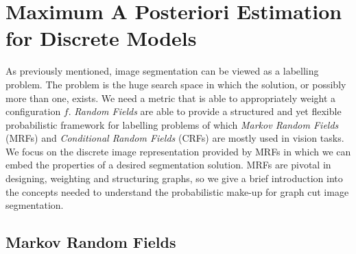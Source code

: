 
\section{Maximum A Posteriori Estimation for Discrete Models}
\label{sec:MAPEstimates}

As previously mentioned, image segmentation can be viewed as a labelling problem.
The problem is the huge search space in which the solution, or possibly more than one, exists.
We need a metric that is able to appropriately weight a configuration $f$.
\textit{Random Fields} are able to provide a structured and yet flexible probabilistic framework for labelling problems of which \textit{Markov Random Fields} (MRFs) and \textit{Conditional Random Fields} (CRFs) are mostly used in vision tasks.
We focus on the discrete image representation provided by MRFs in which we can embed the properties of a desired segmentation solution.
MRFs are pivotal in designing, weighting and structuring graphs, so we give a brief introduction into the concepts needed to understand the probabilistic make-up for graph cut image segmentation.


\subsection{Markov Random Fields}
\label{sec:MarkovRandomFields}

